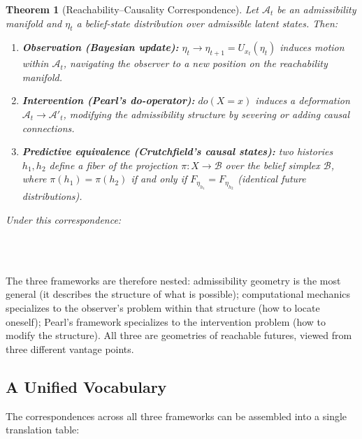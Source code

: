 \documentclass[12pt, a4paper]{article}
\theoremstyle{plain}
\newtheorem{theorem}{Theorem}[section]
\theoremstyle{definition}
\theoremstyle{remark}
\begin{document}
\begin{theorem}[Reachability--Causality Correspondence]
\label{thm:rcc}
Let $\mathcal{A}_t$ be an admissibility manifold and $\eta_t$ a belief-state
distribution over admissible latent states. Then:
\begin{enumerate}[leftmargin=*, label=(\roman*)]
\item \textbf{Observation (Bayesian update):} $\eta_t \to \eta_{t+1} = U_{x_t}(\eta_t)$
induces motion within $\mathcal{A}_t$, navigating the observer to a new position
on the reachability manifold.

\item \textbf{Intervention (Pearl's do-operator):} $do(X = x)$ induces a deformation
$\mathcal{A}_t \to \mathcal{A}'_t$, modifying the admissibility structure by
severing or adding causal connections.

\item \textbf{Predictive equivalence (Crutchfield's causal states):} two histories
$h_1, h_2$ define a fiber of the projection $\pi: X \to \mathcal{B}$ over the
belief simplex $\mathcal{B}$, where $\pi(h_1) = \pi(h_2)$ if and only if
$F_{\eta_{h_1}} = F_{\eta_{h_2}}$ (identical future distributions).
\end{enumerate}
Under this correspondence:
\begin{center}
\\[0.3em]
\\[0.3em]
\end{center}
\end{theorem}

The three frameworks are therefore nested: admissibility geometry is the
most general (it describes the structure of what is possible); computational
mechanics specializes to the observer's problem within that structure (how
to locate oneself); Pearl's framework specializes to the intervention problem
(how to modify the structure). All three are geometries of reachable futures,
viewed from three different vantage points.

\subsection{A Unified Vocabulary}

The correspondences across all three frameworks can be assembled into a
single translation table:
\end{document}
